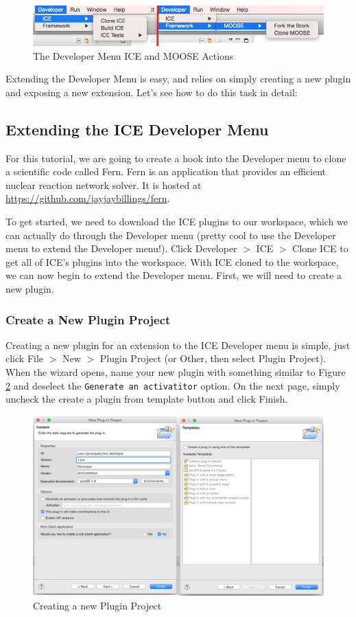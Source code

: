 \begin{figure}[h]
\includegraphics[width=\textwidth]{figures/menu.png}
\caption{The Developer Menu ICE and MOOSE Actions}
\label{fig:devcloneice}
\end{figure}

Extending the Developer Menu is easy, and relies on simply creating a new plugin
and exposing a new extension. Let's see how to do this task in detail:

\subsection*{Extending the ICE Developer Menu}
For this tutorial, we are going to create a hook into the Developer menu to
clone a scientific code called Fern. Fern is an application that provides an
efficient nuclear reaction network solver. It is hosted at
\url{https://github.com/jayjaybillings/fern}. 

To get started, we need to download the ICE plugins to our workspace, which we
can actually do through the Developer menu (pretty cool to use the Developer 
menu to extend the Developer menu!). Click Developer $>$ ICE $>$ Clone ICE to 
get all of ICE's plugins into the workspace. With ICE cloned to the workspace, 
we can now begin to extend the Developer menu. First, we will need to create a
new plugin. 

\subsubsection*{Create a New Plugin Project}
Creating a new plugin for an extension to the ICE Developer menu is simple, just
click File $>$ New $>$ Plugin Project (or Other, then select Plugin Project).
When the wizard opens, name your new plugin with something similar to Figure
\ref{fig:newplugin} and deselect the \texttt{Generate an activatitor} option. On
the next page, simply uncheck the create a plugin from template button and click Finish. 
\begin{figure}[h]
\includegraphics[width=\textwidth]{figures/combinedplugin.png}
\caption{Creating a new Plugin Project}
\label{fig:newplugin}
\end{figure}

